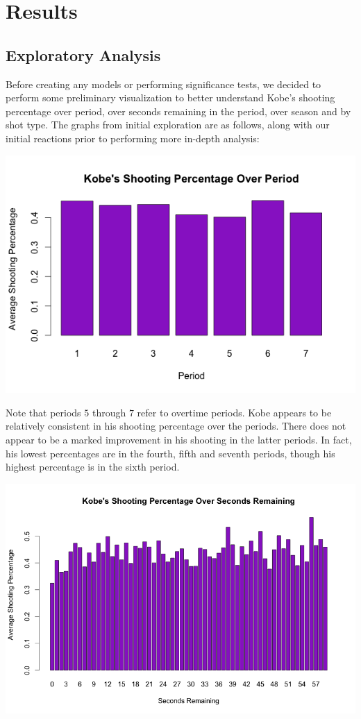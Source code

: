\documentclass[paper=a4, fontsize=11pt]{scrartcl} %
\numberwithin{equation}{section} %
\numberwithin{figure}{section} %
\numberwithin{table}{section} %
\begin{document}
\section{Results}
\subsection{Exploratory Analysis}
Before creating any models or performing significance tests, we decided to perform some preliminary visualization to better understand Kobe's shooting percentage over period, over seconds remaining in the period, over season and by shot type. The graphs from initial exploration are as follows, along with our initial reactions prior to performing more in-depth analysis:
\begin{center}
	\includegraphics[width=14cm]{img/period}
\end{center}
Note that periods $5$ through $7$ refer to overtime periods. Kobe appears to be relatively consistent in his shooting percentage over the periods. There does not appear to be a marked improvement in his shooting in the latter periods. In fact, his lowest percentages are in the fourth, fifth and seventh periods, though his highest percentage is in the sixth period.  
\begin{center}
	\includegraphics[width=14cm]{img/seconds}
\end{center}
\end{document}
